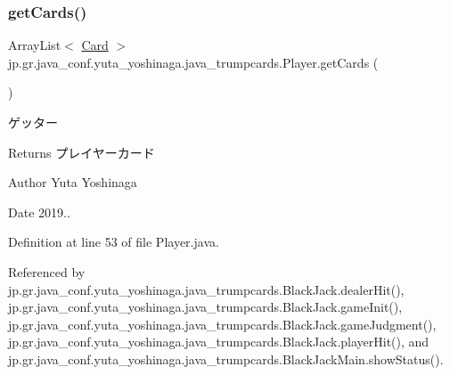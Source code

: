 \subsubsection{\texorpdfstring{get\+Cards()}{getCards()}}
{\footnotesize\ttfamily Array\+List$<$ \hyperlink{classjp_1_1gr_1_1java__conf_1_1yuta__yoshinaga_1_1java__trumpcards_1_1_card}{Card} $>$ jp.\+gr.\+java\+\_\+conf.\+yuta\+\_\+yoshinaga.\+java\+\_\+trumpcards.\+Player.\+get\+Cards (\begin{DoxyParamCaption}{ }\end{DoxyParamCaption})}



ゲッター 

\begin{DoxyReturn}{Returns}
プレイヤーカード 
\end{DoxyReturn}
\begin{DoxyAuthor}{Author}
Yuta Yoshinaga 
\end{DoxyAuthor}
\begin{DoxyDate}{Date}
2019.. 
\end{DoxyDate}


Definition at line 53 of file Player.\+java.



Referenced by jp.\+gr.\+java\+\_\+conf.\+yuta\+\_\+yoshinaga.\+java\+\_\+trumpcards.\+Black\+Jack.\+dealer\+Hit(), jp.\+gr.\+java\+\_\+conf.\+yuta\+\_\+yoshinaga.\+java\+\_\+trumpcards.\+Black\+Jack.\+game\+Init(), jp.\+gr.\+java\+\_\+conf.\+yuta\+\_\+yoshinaga.\+java\+\_\+trumpcards.\+Black\+Jack.\+game\+Judgment(), jp.\+gr.\+java\+\_\+conf.\+yuta\+\_\+yoshinaga.\+java\+\_\+trumpcards.\+Black\+Jack.\+player\+Hit(), and jp.\+gr.\+java\+\_\+conf.\+yuta\+\_\+yoshinaga.\+java\+\_\+trumpcards.\+Black\+Jack\+Main.\+show\+Status().

